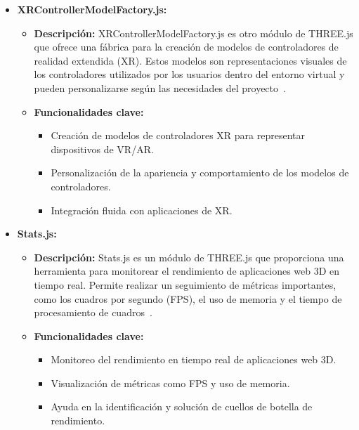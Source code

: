 \documentclass[a4paper, 12pt]{book}
\begin{document}
\begin{itemize}
  \item \textbf{XRControllerModelFactory.js:}
    \begin{itemize}
      \item \textbf{Descripción:} XRControllerModelFactory.js es otro módulo de THREE.js que ofrece una fábrica para la creación de modelos de controladores de 
      realidad extendida (XR). Estos modelos son representaciones visuales de los controladores utilizados por los usuarios dentro del entorno virtual y pueden 
      personalizarse según las necesidades del proyecto~\cite{Documentacion_WebXR}.
      \item \textbf{Funcionalidades clave:}
      \begin{itemize}
        \item Creación de modelos de controladores XR para representar dispositivos de VR/AR.
        \item Personalización de la apariencia y comportamiento de los modelos de controladores.
        \item Integración fluida con aplicaciones de XR.
      \end{itemize}
    \end{itemize}
  
  \item \textbf{Stats.js:}
    \begin{itemize}
      \item \textbf{Descripción:} Stats.js es un módulo de THREE.js que proporciona una herramienta para monitorear el rendimiento de aplicaciones web 3D en tiempo real. 
      Permite realizar un seguimiento de métricas importantes, como los cuadros por segundo (FPS), el uso de memoria y el tiempo de procesamiento de cuadros~\cite{Statsjs}.
      \item \textbf{Funcionalidades clave:}
      \begin{itemize}
        \item Monitoreo del rendimiento en tiempo real de aplicaciones web 3D.
        \item Visualización de métricas como FPS y uso de memoria.
        \item Ayuda en la identificación y solución de cuellos de botella de rendimiento.
      \end{itemize}
    \end{itemize}
  

\end{itemize}
\end{document}
